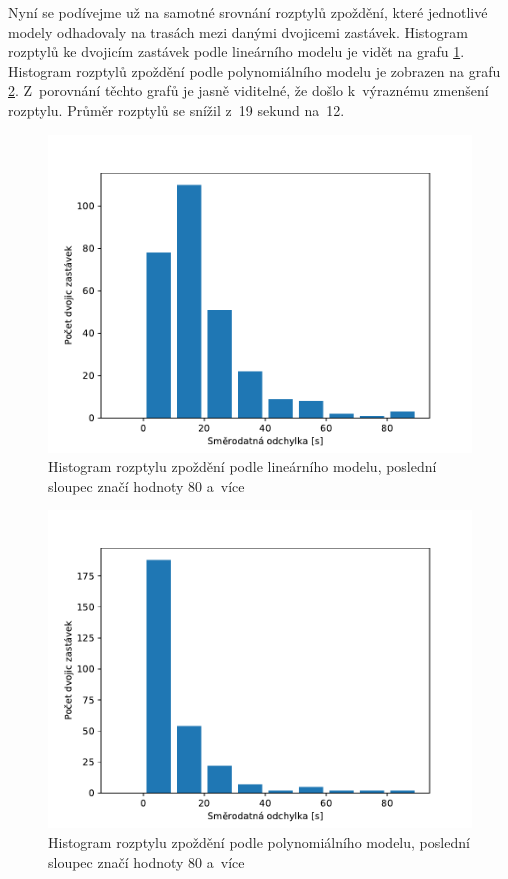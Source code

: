 Nyní se podívejme už na samotné srovnání rozptylů zpoždění, které jednotlivé modely odhadovaly na trasách mezi danými dvojicemi zastávek. Histogram rozptylů ke dvojicím zastávek podle lineárního modelu je vidět na grafu \ref{fig:rozptyl_old}. Histogram rozptylů zpoždění podle polynomiálního modelu je zobrazen na grafu \ref{fig:rozptyl_new}. Z~porovnání těchto grafů je jasně viditelné, že došlo k~výraznému zmenšení rozptylu. Průměr rozptylů se snížil z~19 sekund na~12.


\begin{figure}
   \centering
 \includegraphics[width=\linewidth]{../img/rozptyl_old}
 \caption{Histogram rozptylu zpoždění podle lineárního modelu, poslední sloupec značí hodnoty 80 a~více}
 \label{fig:rozptyl_old}
\end{figure}


\begin{figure}
   \centering
 \includegraphics[width=\linewidth]{../img/rozptyl_new}
 \caption{Histogram rozptylu zpoždění podle polynomiálního modelu, poslední sloupec značí hodnoty 80 a~více}
 \label{fig:rozptyl_new}
\end{figure}


